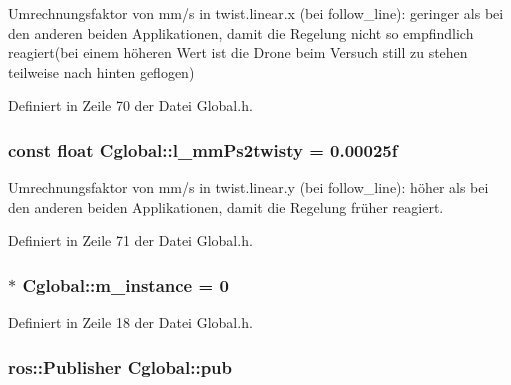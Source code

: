 Umrechnungsfaktor von mm/s in twist.linear.x (bei follow\_\-line): geringer als bei den anderen beiden Applikationen, damit die Regelung nicht so empfindlich reagiert(bei einem höheren Wert ist die Drone beim Versuch still zu stehen teilweise nach hinten geflogen) 



Definiert in Zeile 70 der Datei Global.h.

\hypertarget{class_cglobal_af8f19427d5da8e6c88098b61e8676786}{
\subsubsection[{l\_\-mmPs2twisty}]{\setlength{\rightskip}{0pt plus 5cm}const float {\bf Cglobal::l\_\-mmPs2twisty} = 0.00025f}}
\label{class_cglobal_af8f19427d5da8e6c88098b61e8676786}


Umrechnungsfaktor von mm/s in twist.linear.y (bei follow\_\-line): höher als bei den anderen beiden Applikationen, damit die Regelung früher reagiert. 



Definiert in Zeile 71 der Datei Global.h.

\hypertarget{class_cglobal_afb7ab45601acda975c029de5db73b3ea}{
\subsubsection[{m\_\-instance}]{ $\ast$ {\bf Cglobal::m\_\-instance} = 0}}
\label{class_cglobal_afb7ab45601acda975c029de5db73b3ea}


Definiert in Zeile 18 der Datei Global.h.

\hypertarget{class_cglobal_af3a06302b3bd19de728064359241c1a1}{
\subsubsection[{pub}]{\setlength{\rightskip}{0pt plus 5cm}ros::Publisher {\bf Cglobal::pub}}}
\label{class_cglobal_af3a06302b3bd19de728064359241c1a1}


